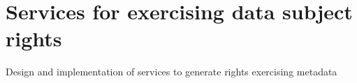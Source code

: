 \section{Services for exercising data subject rights}
\label{sec:rights_api}

Design and implementation of services to generate rights exercising metadata
